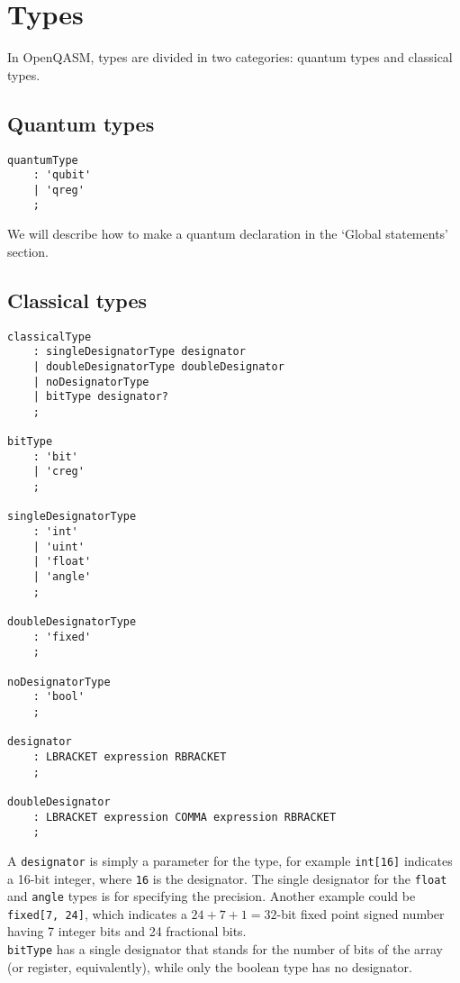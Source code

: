 \documentclass[12pt,a4paper]{report}
\theoremstyle{definition}
\theoremstyle{definition}
\theoremstyle{definition}
\begin{document}
\section{Types}
In OpenQASM, types are divided in two categories: quantum types and classical types.
\subsection{Quantum types}
\begin{lstlisting}
quantumType
    : 'qubit'
    | 'qreg'
    ;
\end{lstlisting}
We will describe how to make a quantum declaration in the `Global statements' section.

\subsection{Classical types}
\begin{lstlisting}
classicalType
    : singleDesignatorType designator
    | doubleDesignatorType doubleDesignator
    | noDesignatorType
    | bitType designator?
    ;

bitType
    : 'bit'
    | 'creg'
    ;

singleDesignatorType
    : 'int'
    | 'uint'
    | 'float'
    | 'angle'
    ;

doubleDesignatorType
    : 'fixed'
    ;

noDesignatorType
    : 'bool'
    ;

designator
    : LBRACKET expression RBRACKET
    ;

doubleDesignator
    : LBRACKET expression COMMA expression RBRACKET
    ;
\end{lstlisting}
A \texttt{designator} is simply a parameter for the type, for example \texttt{int[16]} indicates a 16-bit integer, where \texttt{16} is the designator. The single designator for the \texttt{float} and \texttt{angle} types is for specifying the precision. Another example could be \texttt{fixed[7, 24]}, which indicates a $24+7+1=32$-bit fixed point signed number having 7 integer bits and 24 fractional bits.\\
\texttt{bitType} has a single designator that stands for the number of bits of the  array (or register, equivalently), while only the boolean type has no designator.\\
\end{document}
